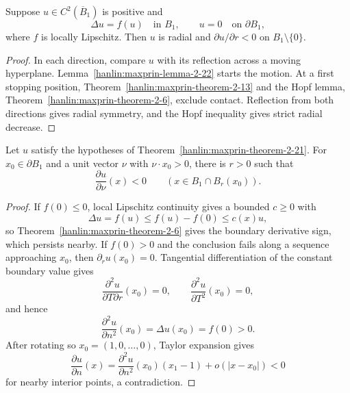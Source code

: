 \begin{theorem}\label{hanlin:maxprin-theorem-2-21}
Suppose $u\in C^2(\overline B_1)$ is positive and
\[
\Delta u=f(u)\quad\text{in }B_1,
\qquad
u=0\quad\text{on }\partial B_1,
\]
where $f$ is locally Lipschitz. Then $u$ is radial and
$\partial u/\partial r<0$ on $B_1\setminus\{0\}$.
\end{theorem}
\begin{proof}
\sketch In each direction, compare $u$ with its reflection across a moving
hyperplane. Lemma~\ref{hanlin:maxprin-lemma-2-22} starts the motion. At a first
stopping position, Theorem~\ref{hanlin:maxprin-theorem-2-13} and the Hopf lemma,
Theorem~\ref{hanlin:maxprin-theorem-2-6}, exclude contact. Reflection from both
directions gives radial symmetry, and the Hopf inequality gives strict radial
decrease.
\end{proof}

\begin{lemma}\label{hanlin:maxprin-lemma-2-22}
Let $u$ satisfy the hypotheses of Theorem~\ref{hanlin:maxprin-theorem-2-21}.
For $x_0\in\partial B_1$ and a unit vector $\nu$ with $\nu\cdot x_0>0$, there
is $r>0$ such that
\[
\frac{\partial u}{\partial\nu}(x)<0
\qquad(x\in B_1\cap B_r(x_0)).
\]
\end{lemma}
\begin{proof}
\sketch If $f(0)\le0$, local Lipschitz continuity gives a bounded $c\ge0$ with
\[
\Delta u=f(u)\le f(u)-f(0)\le c(x)u,
\]
so Theorem~\ref{hanlin:maxprin-theorem-2-6} gives the boundary derivative sign,
which persists nearby. If $f(0)>0$ and the conclusion fails along a sequence
approaching $x_0$, then $\partial_ru(x_0)=0$. Tangential differentiation of the
constant boundary value gives
\[
\frac{\partial^2u}{\partial T\partial r}(x_0)=0,
\qquad
\frac{\partial^2u}{\partial T^2}(x_0)=0,
\]
and hence
\[
\frac{\partial^2u}{\partial n^2}(x_0)=\Delta u(x_0)=f(0)>0.
\]
After rotating so $x_0=(1,0,\ldots,0)$, Taylor expansion gives
\[
\frac{\partial u}{\partial n}(x)
=\frac{\partial^2u}{\partial n^2}(x_0)(x_1-1)+o(|x-x_0|)<0
\]
for nearby interior points, a contradiction.
\end{proof}

